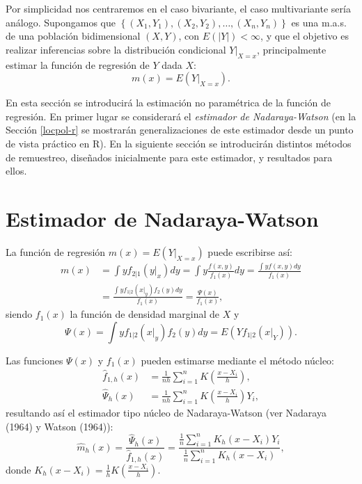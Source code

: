 \documentclass[
]{book}
\theoremstyle{break}
\theoremstyle{nonumberplain}
\begin{document}
Por simplicidad nos centraremos en el caso bivariante, el caso multivariante sería análogo.
Supongamos que \(\left\{ \left( X_1,Y_1 \right),\left( X_2,Y_2 \right), \ldots, \left( X_n,Y_n \right) \right\}\) es una m.a.s. de una población bidimensional \(\left( X,Y \right)\), con \(E\left( \left\vert Y\right\vert \right) <\infty\), y que el objetivo es realizar inferencias sobre la distribución condicional \(\left. Y \right\vert_{X=x}\), principalmente estimar la función de regresión de \(Y\) dada \(X\):
\[m\left( x \right) =E\left( \left. Y\right\vert_{X=x} \right).\]

En esta sección se introducirá la estimación no paramétrica de la función de regresión.
En primer lugar se considerará el \emph{estimador de Nadaraya-Watson} (en la Sección \ref{locpol-r} se mostrarán generalizaciones de este estimador desde un punto de vista práctico en R).
En la siguiente sección se introducirán distintos métodos de remuestreo, diseñados inicialmente para este estimador, y resultados para ellos.

\section{Estimador de Nadaraya-Watson}\label{nadaraya-watson}

La función de regresión \(m\left( x \right) =E\left( \left. Y\right\vert_{X=x} \right)\) puede escribirse así:
\[\begin{aligned}
m\left( x \right) &= \int yf_{2|1}\left( \left. y\right\vert _{x} \right)
dy=\int y\frac{f\left( x,y \right)}{f_1\left( x \right)}dy=\frac{\int
yf\left( x,y \right) dy}{f_1\left( x \right)} \\
&= \frac{\int yf_{1|2}\left( \left. x\right\vert _{y} \right) f_2\left(
y \right) dy}{f_1\left( x \right)}=\frac{\Psi \left( x \right)}{f_1\left(
x \right)},
\end{aligned}\]
siendo \(f_1\left( x \right)\) la función de densidad marginal de \(X\) y
\[\Psi \left( x \right) =\int yf_{1|2}\left( \left. x\right\vert _{y} \right)
f_2\left( y \right) dy=E\left( Yf_{1|2}\left( \left. x\right\vert_{Y} \right)
\right).\]

Las funciones \(\Psi \left( x \right)\) y \(f_1\left( x \right)\) pueden
estimarse mediante el método núcleo:
\[\begin{aligned}
\hat{f}_{1,h}\left( x \right) &= \frac{1}{nh}\sum_{i=1}^{n}K\left( \frac{
x-X_i}{h} \right), \\
\hat{\Psi}_{h}\left( x \right) &= \frac{1}{nh}\sum_{i=1}^{n}K\left( \frac{
x-X_i}{h} \right) Y_i,
\end{aligned}\]
resultando así el estimador tipo núcleo de Nadaraya-Watson
(ver Nadaraya (1964) y Watson (1964)):
\[\hat{m}_{h}\left( x \right) =\frac{\hat{\Psi}_{h}\left( x \right)}{\hat{f}
_{1,h}\left( x \right)}=\frac{\frac{1}{n}\sum_{i=1}^{n}K_{h}\left(
x-X_i \right) Y_i}{\frac{1}{n}\sum_{i=1}^{n}K_{h}\left( x-X_i \right)},\]
donde \(K_{h}\left( x-X_i \right) =\frac{1}{h}K\left( \frac{x-X_i}{h} \right)\).
\end{document}
